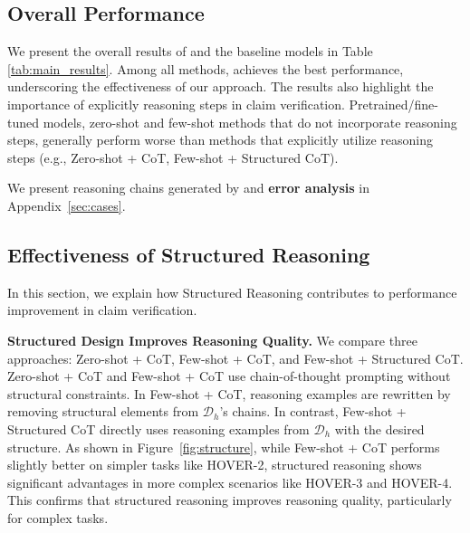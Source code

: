 \subsection{Overall Performance}
We present the overall results of \themodel and the baseline models in Table \ref{tab:main_results}. Among all methods, \themodel achieves the best performance, underscoring the effectiveness of our approach. The results also highlight the importance of explicitly reasoning steps in claim verification. Pretrained/fine-tuned models, zero-shot and few-shot methods that do not incorporate reasoning steps, generally perform worse than methods that explicitly utilize reasoning steps (e.g., Zero-shot + CoT, Few-shot + Structured CoT). 

We present reasoning chains generated by \themodel and \textbf{error analysis} in Appendix~\ref{sec:cases}.


\subsection{Effectiveness of Structured Reasoning}
In this section, we explain how Structured Reasoning contributes to performance improvement in claim verification.

\textbf{Structured Design Improves Reasoning Quality.}\xspace
We compare three approaches: Zero-shot + CoT, Few-shot + CoT, and Few-shot + Structured CoT. Zero-shot + CoT and Few-shot + CoT use chain-of-thought prompting without structural constraints. In Few-shot + CoT, reasoning examples are rewritten by removing structural elements from $\mathcal{D}_h$'s chains. In contrast, Few-shot + Structured CoT directly uses reasoning examples from $\mathcal{D}_h$ with the desired structure. As shown in Figure~\ref{fig:structure}, while Few-shot + CoT performs slightly better on simpler tasks like HOVER-2, structured reasoning shows significant advantages in more complex scenarios like HOVER-3 and HOVER-4. This confirms that structured reasoning improves reasoning quality, particularly for complex tasks.


